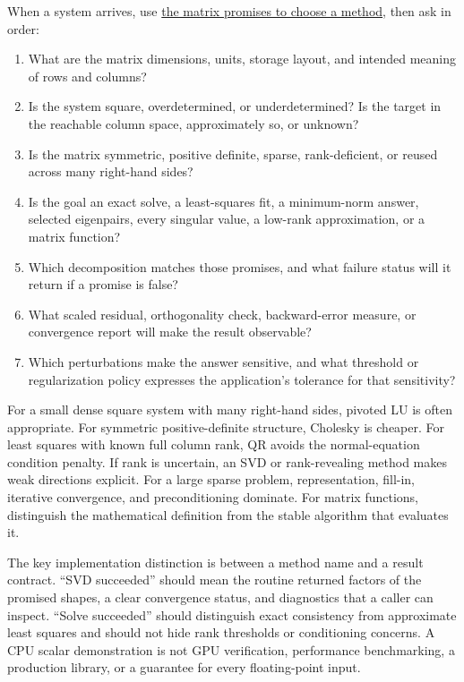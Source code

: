 \hypertarget{02-foundations-ii-ch038-close-the-journey-with-an-algorithm-selection-conversation}{}

When a system arrives, use \hyperref[02-foundations-ii-ch038-choose-a-factorization-from-structure-and-the-requested-answer]{the matrix promises to choose a method}, then ask in order:

\begin{enumerate}
\def\labelenumi{\arabic{enumi}.}
\tightlist
\item
  What are the matrix dimensions, units, storage layout, and intended meaning of rows and columns?
\item
  Is the system square, overdetermined, or underdetermined? Is the target in the reachable column space, approximately so, or unknown?
\item
  Is the matrix symmetric, positive definite, sparse, rank-deficient, or reused across many right-hand sides?
\item
  Is the goal an exact solve, a least-squares fit, a minimum-norm answer, selected eigenpairs, every singular value, a low-rank approximation, or a matrix function?
\item
  Which decomposition matches those promises, and what failure status will it return if a promise is false?
\item
  What scaled residual, orthogonality check, backward-error measure, or convergence report will make the result observable?
\item
  Which perturbations make the answer sensitive, and what threshold or regularization policy expresses the application's tolerance for that sensitivity?
\end{enumerate}

For a small dense square system with many right-hand sides, pivoted LU is often appropriate. For symmetric positive-definite structure, Cholesky is cheaper. For least squares with known full column rank, QR avoids the normal-equation condition penalty. If rank is uncertain, an SVD or rank-revealing method makes weak directions explicit. For a large sparse problem, representation, fill-in, iterative convergence, and preconditioning dominate. For matrix functions, distinguish the mathematical definition from the stable algorithm that evaluates it.

The key implementation distinction is between a method name and a result contract. ``SVD succeeded'' should mean the routine returned factors of the promised shapes, a clear convergence status, and diagnostics that a caller can inspect. ``Solve succeeded'' should distinguish exact consistency from approximate least squares and should not hide rank thresholds or conditioning concerns. A CPU scalar demonstration is not GPU verification, performance benchmarking, a production library, or a guarantee for every floating-point input.

